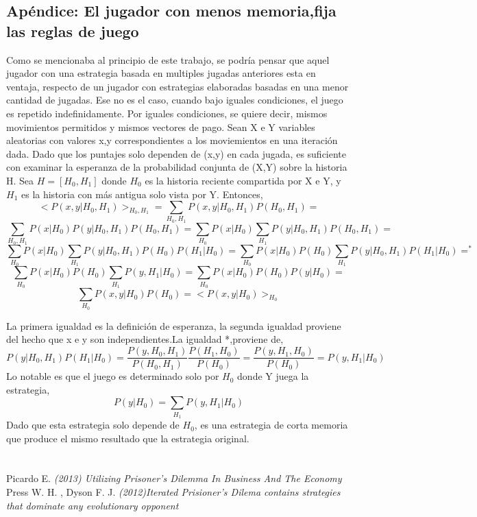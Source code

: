 \documentclass[12pt]{article}
\begin{document}
\subsection{Apéndice: El jugador con menos memoria,fija las reglas de juego}
Como se mencionaba al principio de este trabajo, se podría pensar que aquel jugador
con una estrategia basada en multiples jugadas anteriores esta en ventaja, respecto de 
un jugador con estrategias elaboradas basadas en una menor cantidad de jugadas.
Ese no es el caso, cuando bajo iguales condiciones, el juego es repetido  indefinidamente.
Por iguales condiciones, se quiere decir, mismos movimientos permitidos y mismos vectores
de pago.\newline
Sean X e Y variables aleatorias con valores x,y correspondientes a los moviemientos en una iteración dada.
Dado que los puntajes solo dependen de (x,y) en cada jugada, es suficiente con examinar la esperanza
de la probabilidad conjunta de  (X,Y) sobre la historia H.
Sea $H=[H_0,H_1]$ donde $H_0$ es la historia reciente compartida por X e Y, y $H_1$ es la historia con más antigua
solo vista por Y. Entonces,
$$<P(x,y|H_0,H_1)>_{H_0,H_1}=\sum_{H_0,H_1}P(x,y|H_0,H_1) P(H_0,H_1)=$$
$$\sum_{H_0,H_1} P(x|H_0)P(y|H_0,H_1)P(H_0,H_1)=\sum_{H_0} P(x|H_0) \sum_{H_1} P(y|H_0,H_1)P(H_0,H_1)=$$
$$\sum_{H_0}P(x|H_0)\sum_{H_1}P(y|H_0,H_1)P(H_0)P(H_1|H_0) =\sum_{H_0}P(x|H_0)P(H_0) \sum_{H_1}P(y|H_0,H_1)P(H_1|H_0)=^*$$
$$\sum_{H_0}P(x|H_0)P(H_0)\sum_{H_1} P(y,H_1|H_0)=\sum_{H_0}P(x|H_0)P(H_0)P(y|H_0)=$$
$$\sum_{H_0}P(x,y|H_0)P(H_0)=<P(x,y|H_0)>_{H_0} $$

La primera igualdad es la definición de esperanza, la segunda igualdad proviene del hecho que x e y son independientes.La 
igualdad *,proviene de,
$$P(y|H_0,H_1)P(H_1|H_0)=\frac{P(y,H_0,H_1)}{P(H_0,H_1)} \frac{P(H_1,H_0)}{P(H_0)}=\frac{P(y,H_1,H_0)}{P(H_0)}=P(y,H_1|H_0)$$
Lo notable es que el juego es determinado solo por $H_0$ donde Y juega la estrategia,
$$P(y|H_0)=\sum_{H_1}P(y,H_1|H_0)$$
Dado que esta estrategia solo depende de $H_0$, es una estrategia de corta memoria que produce el mismo
resultado que la estrategia original.


\newpage
 \section{}
  \begin{thebibliography}{1}
  \bibitem{}  Picardo E. {\em (2013) Utilizing Prisoner’s Dilemma In Business And The Economy }
  \bibitem{}  Press W. H. , Dyson F. J.  {\em (2012)Iterated Prisioner's Dilema contains strategies that dominate any evolutionary opponent}  
  \end{thebibliography}
\end{document}
